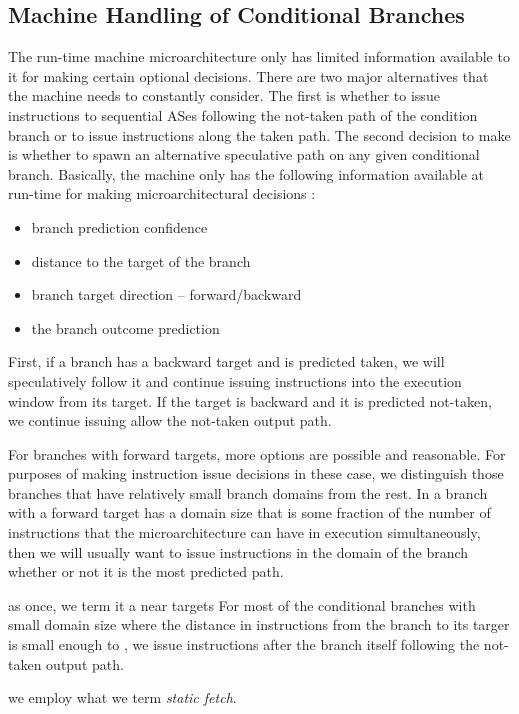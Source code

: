 \documentclass[10pt,dvips]{article}
\begin{document}
\subsection{Machine Handling of Conditional Branches}
%
The run-time machine microarchitecture only has limited information
available to it for making certain optional decisions.
There are two major alternatives that the machine needs to constantly
consider.  The first is whether to issue instructions to sequential
ASes following
the not-taken path of the condition branch or to issue instructions
along the 
taken path.  
The second decision to make is
whether to spawn an alternative speculative path
on any given conditional branch.
Basically, the machine only has the following information
available at run-time for making microarchitectural decisions :

\begin{itemize}
\item{branch prediction confidence}
\item{distance to the target of the branch}
\item{branch target direction -- forward/backward}
\item{the branch outcome prediction}
\end{itemize}   

First, if a branch has a backward target and is predicted taken,
we will speculatively follow it and continue issuing instructions
into the execution window from its target.  If the target is backward
and it is predicted not-taken, we continue issuing allow the
not-taken output path.

For branches with forward targets, more options are possible and
reasonable.
For purposes of making instruction issue decisions in these case, we 
distinguish
those branches that have relatively small branch domains from 
the rest.  In a branch with a forward target has a domain 
size that is some fraction of
the number of instructions that the microarchitecture can have
in execution simultaneously, then we will usually want to
issue instructions in the domain of the branch whether or not
it is the most predicted path.

as once, we term it a 
near targets
For most of the conditional branches with small domain size
where the distance in instructions from the 
branch to its targer is small enough to , 
we issue instructions after the branch itself following the not-taken
output path.

we employ what we term
\textit{static fetch}.
\end{document}
